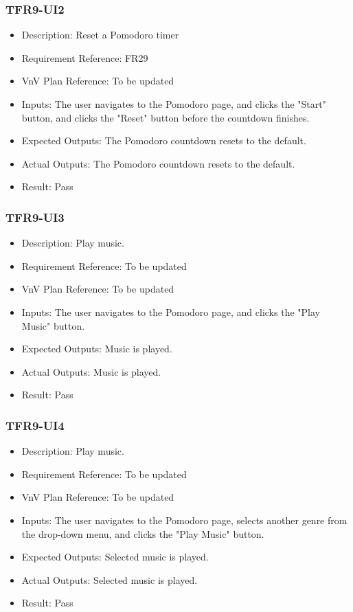 \documentclass[12pt, titlepage]{article}
\begin{document}
\subsubsection{TFR9-UI2}\label{3.2.11}
\begin{itemize}
    \item Description: Reset a Pomodoro timer
    \item Requirement Reference: FR29
    \item VnV Plan Reference: To be updated
    \item Inputs: The user navigates to the Pomodoro page, and clicks the "Start" button, and clicks the "Reset" button before the countdown finishes.
    \item Expected Outputs: The Pomodoro countdown resets to the default.
    \item Actual Outputs: The Pomodoro countdown resets to the default.
    \item Result: Pass
\end{itemize}

\subsubsection{TFR9-UI3}\label{3.2.12}
\begin{itemize}
    \item Description: Play music.
    \item Requirement Reference: To be updated
    \item VnV Plan Reference: To be updated
    \item Inputs: The user navigates to the Pomodoro page, and clicks the "Play Music" button.
    \item Expected Outputs: Music is played.
    \item Actual Outputs: Music is played.
    \item Result: Pass
\end{itemize}

\subsubsection{TFR9-UI4}\label{3.2.13}
\begin{itemize}
    \item Description: Play music.
    \item Requirement Reference: To be updated
    \item VnV Plan Reference: To be updated
    \item Inputs: The user navigates to the Pomodoro page, selects another genre from the drop-down menu, and clicks the "Play Music" button.
    \item Expected Outputs: Selected music is played.
    \item Actual Outputs: Selected music is played.
    \item Result: Pass
\end{itemize}
\end{document}
